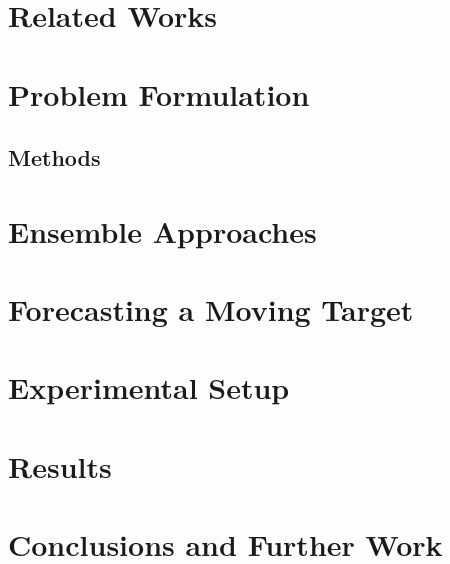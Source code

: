 \documentclass[twoside,leqno,twocolumn]{article}
\begin{document}
\section{\label{sec:related}Related Works}


\section{\label{sec:problem} Problem Formulation}

 
\subsection{\label{sec:methods} Methods}


\section{\label{sec:ensemble} Ensemble Approaches}


\section{\label{sec:moving} Forecasting a Moving Target}


\section{\label{sec:experiments} Experimental Setup}


\section{\label{sec:results} Results}


\section{\label{sec:conclusions} Conclusions and Further Work}


\iffalse
\section*{Acknowledgements}
{\footnotesize
This work is supported by the Intelligence Advanced Research Projects Activity
(IARPA) via Department of Interior National Business Center (DoI/NBC)
contract number D12PC000337, the US Government is authorized to
reproduce and distribute reprints for Governmental purposes
notwithstanding any copyright annotation thereon. Disclaimer: The
views and conclusions contained herein are those of the authors and
should not be interpreted as necessarily representing the official
policies or endorsements, either expressed or implied, of IARPA,
DoI/NBC, or the US Government.
}
\fi


\end{document}

